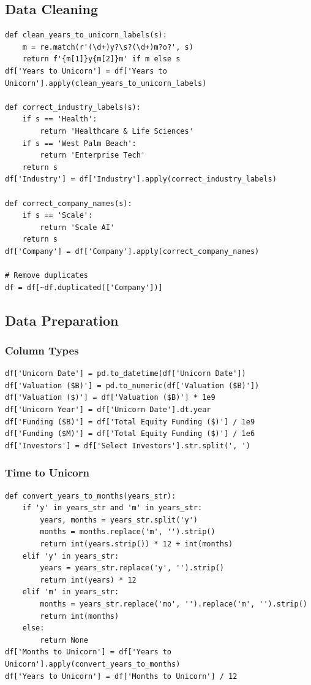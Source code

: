 \documentclass[a4paper,12pt]{article}
\begin{document}
\subsection{Data Cleaning}
\label{sec:orge1b37ed}
\begin{verbatim}
def clean_years_to_unicorn_labels(s):
    m = re.match(r'(\d+)y?\s?(\d+)m?o?', s)
    return f'{m[1]}y{m[2]}m' if m else s
df['Years to Unicorn'] = df['Years to Unicorn'].apply(clean_years_to_unicorn_labels)

def correct_industry_labels(s):
    if s == 'Health':
        return 'Healthcare & Life Sciences'
    if s == 'West Palm Beach':
        return 'Enterprise Tech'
    return s
df['Industry'] = df['Industry'].apply(correct_industry_labels)

def correct_company_names(s):
    if s == 'Scale':
        return 'Scale AI'
    return s
df['Company'] = df['Company'].apply(correct_company_names)

# Remove duplicates
df = df[~df.duplicated(['Company'])]
\end{verbatim}
\subsection{Data Preparation}
\label{sec:org8902c98}
\subsubsection{Column Types}
\label{sec:orgc185560}
\begin{verbatim}
df['Unicorn Date'] = pd.to_datetime(df['Unicorn Date'])
df['Valuation ($B)'] = pd.to_numeric(df['Valuation ($B)'])
df['Valuation ($)'] = df['Valuation ($B)'] * 1e9
df['Unicorn Year'] = df['Unicorn Date'].dt.year
df['Funding ($B)'] = df['Total Equity Funding ($)'] / 1e9
df['Funding ($M)'] = df['Total Equity Funding ($)'] / 1e6
df['Investors'] = df['Select Investors'].str.split(', ')
\end{verbatim}
\subsubsection{Time to Unicorn}
\label{sec:org019162c}
\begin{verbatim}
def convert_years_to_months(years_str):
    if 'y' in years_str and 'm' in years_str:
        years, months = years_str.split('y')
        months = months.replace('m', '').strip()
        return int(years.strip()) * 12 + int(months)
    elif 'y' in years_str:
        years = years_str.replace('y', '').strip()
        return int(years) * 12
    elif 'm' in years_str:
        months = years_str.replace('mo', '').replace('m', '').strip()
        return int(months)
    else:
        return None
df['Months to Unicorn'] = df['Years to Unicorn'].apply(convert_years_to_months)
df['Years to Unicorn'] = df['Months to Unicorn'] / 12
\end{verbatim}
\end{document}
